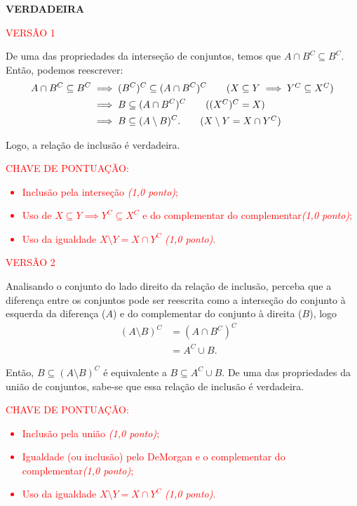 \textbf{VERDADEIRA}

\textcolor{red}{ VERSÃO 1 } %

De uma das propriedades da interseção de conjuntos, temos que $A \cap B^{C} \subseteq B^{C}$.
Então, podemos reescrever:
\begin{align*}
    A \cap B^{C} \subseteq B^{C} &\implies (B^{C})^{C} \subseteq (A \cap B^{C})^{C} \tag{$X \subseteq Y \implies Y^C \subseteq X^C$} \\ 
    & \implies B \subseteq (A \cap B^{C})^{C} \tag{$(X^C)^C = X$}\\ 
    &\implies B \subseteq (A \setminus B)^{C} . \tag{$X\setminus Y  = X \cap Y^{C}$}
\end{align*}

Logo, a relação de inclusão é verdadeira.




\bigskip

\textcolor{red}{CHAVE DE PONTUAÇÃO:
\begin{itemize}
    \item  Inclusão pela interseção \emph{(1,0 ponto)};
    \item Uso de $X \subseteq Y \implies Y^C \subseteq X^C$ e do complementar do complementar\emph{(1,0 ponto)};
    \item  Uso da igualdade $X \setminus Y = X \cap Y^C$ \emph{(1,0 ponto)}.
\end{itemize} } 

\bigskip


\textcolor{red}{ VERSÃO 2} %


Analisando o conjunto do lado direito da relação de inclusão, perceba que a diferença entre os conjuntos pode ser reescrita como a interseção do conjunto à esquerda da diferença ($A$) e do complementar do conjunto à direita ($B$), logo 
\begin{align}
    (A\setminus B)^{C} & = (A \cap B^{C})^{C} & \tag{diferença de conjuntos} \\
    & = A^{C} \cup B. & \tag{De Morgan e $(X^C)^C = X$}
\end{align}

Então,  $B \subseteq (A \setminus B)^{C}$ é equivalente a $B \subseteq A^{C} \cup B$. De uma das propriedades da união de conjuntos, sabe-se que essa relação de inclusão é verdadeira.



\bigskip






\textcolor{red}{CHAVE DE PONTUAÇÃO:
\begin{itemize}
    \item  Inclusão pela união \emph{(1,0 ponto)};
    \item  Igualdade (ou inclusão) pelo DeMorgan e o complementar do complementar\emph{(1,0 ponto)};
    \item  Uso da igualdade $X \setminus Y = X \cap Y^C$ \emph{(1,0 ponto)}.
\end{itemize} }